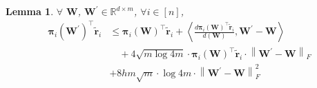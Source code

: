 \documentclass[10pt]{article}
\def\rvtilder{{\tilde{\mathbf{r}}}}
\newtheorem{lem}{Lemma}
\def\rvpi{{\boldsymbol{\pi}}}
\def\rmW{{\mathbf{W}}}
\def\sR{{\mathbb{R}}}
\begin{document}
\begin{lem}
\label{lem:semi_smoothness}
     $\forall$ $\rmW$, $\rmW^\prime \in \sR^{d \times m}$, $\forall i \in [n]$,
\begin{equation*}
\begin{split}
    \rvpi_i\left( \rmW^\prime \right)^\top \rvtilder_i &\le \rvpi_i\left( \rmW \right)^\top \rvtilder_i + \left\langle \frac{d \rvpi_i\left( \rmW \right)^\top \rvtilder_i }{d\left( \rmW \right)}, \rmW^\prime - \rmW \right\rangle \\
    &\quad + 4 \sqrt{m \log{4m}} \cdot \rvpi_i\left( \rmW \right)^\top \rvtilder_i \cdot \left\| \rmW^\prime - \rmW \right\|_F \\
    &+ 8 h m \sqrt{m } \cdot \log{4m} \cdot \left\| \rmW^\prime - \rmW \right\|_F^2
\end{split}
\end{equation*}
\end{lem}
\end{document}
